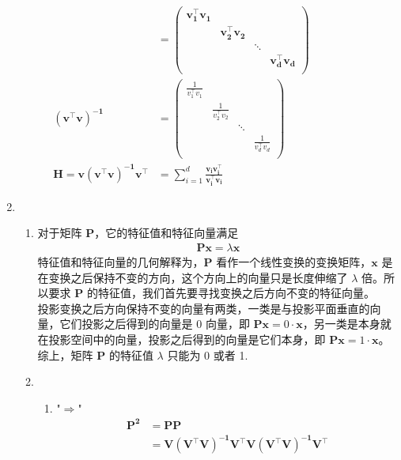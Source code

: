 \documentclass[11pt,letter,notitlepage]{article}
\begin{document}
\begin{solution}
\begin{enumerate}
\begin{enumerate}
$$			$$
			$\quad \begin{aligned} & \mathbf{=\left(\begin{array}{cccc}{v_{1}^{\top} v_{1}} \\ \  & {v_{2}^{\top} v_{2}} \\ \ & \ & \ddots \\ \ & & & {v_{d}^{\top} v_{d}} \\ \end{array}\right)} \\ \mathbf{\left(v^{\top} v\right)^{-1}} &=\left(\begin{array}{cccc} \frac{1}{{v_{1}^{\top} v_{1}}} \\ \  & \frac{1}{{v_{2}^{\top} v_{2}}} \\ \ & \ & \ddots \\ \ & & & \frac{1}{{v_{d}^{\top} v_{d}}} \\ \end{array}\right) \\ \mathbf{H=v\left(v^{\top} v\right)^{-1} v^{\top}} &= \sum\limits_{i=1}^d \mathbf{\frac{v_iv_i^{\top}}{v_i^{\top}v_i}} 
			\end{aligned}$
		\end{enumerate}
		\item 
		\begin{enumerate}
			\item 对于矩阵 $\mathbf{P}$，它的特征值和特征向量满足
				\begin{align*}
					\mathbf{P}\mathbf{x} = \lambda\mathbf{x}
				\end{align*}
			特征值和特征向量的几何解释为，$\mathbf{P}$ 看作一个线性变换的变换矩阵，$\mathbf{x}$ 是在变换之后保持不变的方向，这个方向上的向量只是长度伸缩了 $\lambda$ 倍。所以要求 $\mathbf{P}$ 的特征值，我们首先要寻找变换之后方向不变的特征向量。\\
			投影变换之后方向保持不变的向量有两类，一类是与投影平面垂直的向量，它们投影之后得到的向量是 $0$ 向量，即 $\mathbf{P}\mathbf{x} = 0 \cdot \mathbf{x} $，另一类是本身就在投影空间中的向量，投影之后得到的向量是它们本身，即 $\mathbf{P}\mathbf{x} = 1 \cdot \mathbf{x}$。综上，矩阵 $\mathbf{P}$ 的特征值 $\lambda$ 只能为 0 或者 1.
			\item \begin{enumerate}
				\item "$\Rightarrow$" \\
				\begin{align*}
					\mathbf{P^2} &= \mathbf{P P}\\
					& = \mathbf{V(V^{\top}V)^{-1}V^{\top}V(V^{\top}V)^{-1}V^{\top}}\\

\end{align*}
\end{enumerate}
\end{enumerate}
\end{enumerate}
\end{solution}
\end{document}

